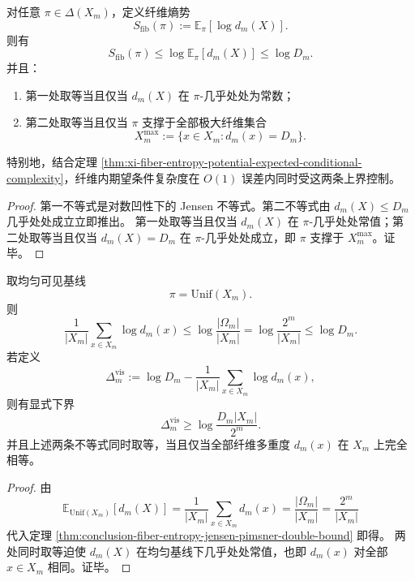 \begin{theorem}\label{thm:conclusion-fiber-entropy-jensen-pimsner-double-bound}
对任意 \(\pi\in\Delta(X_m)\)，定义纤维熵势
\[
S_{\mathrm{fib}}(\pi):=\mathbb E_{\pi}[\log d_m(X)].
\]
则有
\[
S_{\mathrm{fib}}(\pi)\le \log \mathbb E_{\pi}[d_m(X)]\le \log D_m.
\]
并且：
\begin{enumerate}
  \item 第一处取等当且仅当 \(d_m(X)\) 在 \(\pi\)-几乎处处为常数；
  \item 第二处取等当且仅当 \(\pi\) 支撑于全部极大纤维集合
  \[
  X_m^{\max}:=\{x\in X_m:d_m(x)=D_m\}.
  \]
\end{enumerate}
特别地，结合定理 \ref{thm:xi-fiber-entropy-potential-expected-conditional-complexity}，纤维内期望条件复杂度在 \(O(1)\) 误差内同时受这两条上界控制。
\end{theorem}
\begin{proof}
第一不等式是对数凹性下的 Jensen 不等式。第二不等式由 \(d_m(X)\le D_m\) 几乎处处成立立即推出。
第一处取等当且仅当 \(d_m(X)\) 在 \(\pi\)-几乎处处常值；第二处取等当且仅当 \(d_m(X)=D_m\) 在 \(\pi\)-几乎处处成立，即 \(\pi\) 支撑于 \(X_m^{\max}\)。证毕。
\end{proof}

\begin{corollary}[均匀可见基线的双缺口律]\label{cor:conclusion-uniform-visible-baseline-double-gap}
取均匀可见基线
\[
\pi=\mathrm{Unif}(X_m).
\]
则
\[
\frac{1}{|X_m|}\sum_{x\in X_m}\log d_m(x)
\le
\log\frac{|\Omega_m|}{|X_m|}
=
\log\frac{2^m}{|X_m|}
\le
\log D_m.
\]
若定义
\[
\Delta_m^{\mathrm{vis}}
:=
\log D_m-\frac{1}{|X_m|}\sum_{x\in X_m}\log d_m(x),
\]
则有显式下界
\[
\Delta_m^{\mathrm{vis}}
\ge
\log\frac{D_m|X_m|}{2^m}.
\]
并且上述两条不等式同时取等，当且仅当全部纤维多重度 \(d_m(x)\) 在 \(X_m\) 上完全相等。
\end{corollary}
\begin{proof}
由
\[
\mathbb E_{\mathrm{Unif}(X_m)}[d_m(X)]
=
\frac{1}{|X_m|}\sum_{x\in X_m}d_m(x)
=
\frac{|\Omega_m|}{|X_m|}
=
\frac{2^m}{|X_m|}
\]
代入定理 \ref{thm:conclusion-fiber-entropy-jensen-pimsner-double-bound} 即得。
两处同时取等迫使 \(d_m(X)\) 在均匀基线下几乎处处常值，也即 \(d_m(x)\) 对全部 \(x\in X_m\) 相同。证毕。
\end{proof}

